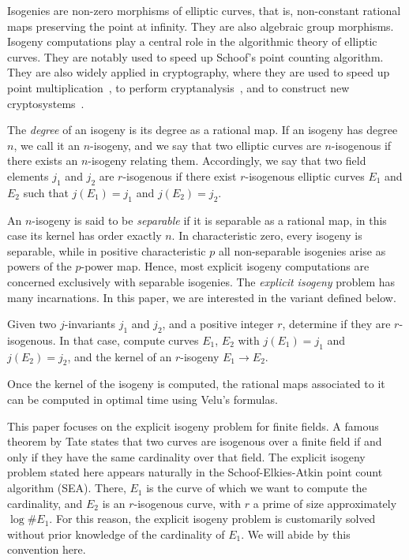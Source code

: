 \documentclass{lms}
\begin{document}
Isogenies are non-zero morphisms of elliptic curves, that is,
non-constant rational maps preserving the point at infinity. They are
also algebraic group morphisms. Isogeny computations play a central
role in the algorithmic theory of elliptic curves. They are notably
used to speed up Schoof's point counting
algorithm\cite{schoof85,atkin88,elkies92,schoof95,elkies98}. They are
also widely applied in cryptography, where they are used to speed up
point multiplication~\cite{gallant+lambert+vanstone01,birkner+sica11},
to perform cryptanalysis~\cite{mauer+menezes+teske01}, and to
construct new
cryptosystems~\cite{teske06,charles+lauter+goren09,Stol,defeo+jao+plut12,jao+soukharev2014-signatures}.

The \emph{degree} of an isogeny is its degree as a rational map. If an
isogeny has degree $n$, we call it an $n$-isogeny, and we say that two
elliptic curves are $n$-isogenous if there exists an $n$-isogeny
relating them. Accordingly, we say that two field elements $j_1$ and
$j_2$ are $r$-isogenous if there exist $r$-isogenous elliptic curves
$E_1$ and $E_2$ such that $j(E_1)=j_1$ and $j(E_2)=j_2$.

An $n$-isogeny is said to be \emph{separable} if it is
separable as a rational map, in this case its kernel has order exactly
$n$. In characteristic zero, every isogeny is separable, while in
positive characteristic $p$ all non-separable isogenies arise as
powers of the $p$-power map. Hence, most explicit isogeny computations
are concerned exclusively with separable isogenies.  The
\emph{explicit isogeny} problem has many incarnations. In this paper,
we are interested in the variant defined below.

\begin{prob}
  Given two $j$-invariants $j_1$ and $j_2$, and a positive integer
  $r$, determine if they are $r$-isogenous. In that case, compute
  curves $E_1$, $E_2$ with $j(E_1)=j_1$ and $j(E_2)=j_2$, and the
  kernel of an $r$-isogeny $E_1\to E_2$.
\end{prob}

Once the kernel of the isogeny is computed, the rational maps
associated to it can be computed in optimal time using Velu's
formulas\cite{velu71}.

This paper focuses on the explicit isogeny problem for finite
fields. A famous theorem by Tate states that two curves are isogenous
over a finite field if and only if they have the same cardinality over
that field. The explicit isogeny problem stated here appears naturally
in the Schoof-Elkies-Atkin point count algorithm (SEA). There, $E_1$
is the curve of which we want to compute the cardinality, and $E_2$ is
an $r$-isogenous curve, with $r$ a prime of size approximately
$\log\#E_1$. For this reason, the explicit isogeny problem is
customarily solved without prior knowledge of the cardinality of
$E_1$. We will abide by this convention here.
\end{document}
